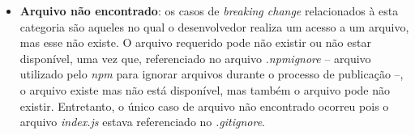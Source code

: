\begin{itemize}
    \item \textbf{Arquivo não encontrado}: os casos de \textit{breaking change} relacionados à esta categoria são aqueles no qual o desenvolvedor realiza um acesso a um arquivo, mas esse não existe. O arquivo requerido pode não existir ou não estar disponível, uma vez que, referenciado no arquivo \textit{.npmignore} -- arquivo utilizado pelo \textit{npm} para ignorar arquivos durante o processo de publicação --, o arquivo existe mas não está disponível, mas também o arquivo pode não existir. Entretanto, o único caso de arquivo não encontrado ocorreu pois o arquivo \textit{index.js} estava referenciado no \textit{.gitignore}.%

\end{itemize}{}